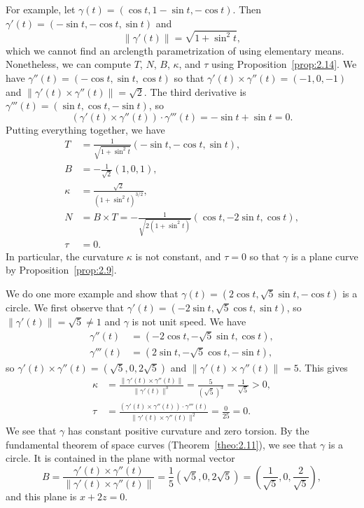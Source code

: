 For example, let $\gamma(t) = (\cos t, 1-\sin t, -\cos t)$. Then 
$\gamma'(t) = (-\sin t, -\cos t, \sin t)$ and 
\[ \|\gamma'(t)\| = \sqrt{1 + \sin^2 t}, \] 
which we cannot find an arclength parametrization of using elementary means. 
Nonetheless, we can compute $T$, $N$, $B$, $\kappa$, and $\tau$ using 
Proposition~\ref{prop:2.14}. We have $\gamma''(t) = (-\cos t, \sin t, \cos t)$ 
so that $\gamma'(t) \times \gamma''(t) = (-1, 0, -1)$ and 
$\|\gamma'(t) \times \gamma''(t)\| = \sqrt{2}$. The third derivative is 
$\gamma'''(t) = (\sin t, \cos t, -\sin t)$, so 
\[ (\gamma'(t) \times \gamma''(t)) \cdot \gamma'''(t) = -\sin t + \sin t = 0. \] 
Putting everything together, we have 
\begin{align*}
    T &= \frac{1}{\sqrt{1+\sin^2 t}} (-\sin t, -\cos t, \sin t), \\ 
    B &= -\frac{1}{\sqrt{2}}(1, 0, 1), \\ 
    \kappa &= \frac{\sqrt{2}}{(1 + \sin^2 t)^{3/2}}, \\ 
    N &= B \times T = -\frac{1}{\sqrt{2(1+\sin^2 t)}}(\cos t, -2\sin t, \cos t), \\ 
    \tau &= 0.
\end{align*}
In particular, the curvature $\kappa$ is not constant, and $\tau = 0$ 
so that $\gamma$ is a plane curve by Proposition~\ref{prop:2.9}.

We do one more example and show that $\gamma(t) = (2\cos t, \sqrt{5}\sin t, 
-\cos t)$ is a circle. We first observe that 
$\gamma'(t) = (-2\sin t, \sqrt{5}\cos t, \sin t)$, so $\|\gamma'(t)\| = 
\sqrt{5} \neq 1$ and $\gamma$ is not unit speed. We have 
\begin{align*}
    \gamma''(t) &= (-2\cos t, -\sqrt{5}\sin t, \cos t), \\ 
    \gamma'''(t) &= (2\sin t, -\sqrt{5}\cos t, -\sin t), 
\end{align*}
so $\gamma'(t) \times \gamma''(t) = (\sqrt{5}, 0, 2\sqrt{5})$ and 
$\|\gamma'(t) \times \gamma''(t)\| = 5$. This gives 
\begin{align*} 
    \kappa &= \frac{\|\gamma'(t) \times \gamma''(t)\|}{\|\gamma'(t)\|^3}
    = \frac{5}{(\sqrt{5})^3} = \frac{1}{\sqrt{5}} > 0, \\ 
    \tau &= \frac{(\gamma'(t) \times \gamma''(t)) \cdot \gamma'''(t)}
    {\|\gamma'(t) \times \gamma''(t)\|^2} = \frac{0}{25} = 0. 
\end{align*}
We see that $\gamma$ has constant positive curvature and zero torsion.
By the fundamental theorem of space curves (Theorem~\ref{theo:2.11}), we 
see that $\gamma$ is a circle. It is contained in the plane with normal vector 
\[ B = \frac{\gamma'(t) \times \gamma''(t)}{\|\gamma'(t) \times \gamma''(t)\|}
= \frac15(\sqrt{5}, 0, 2\sqrt{5}) = \left( \frac{1}{\sqrt{5}}, 0, 
\frac{2}{\sqrt{5}} \right), \]
and this plane is $x + 2z = 0$.

